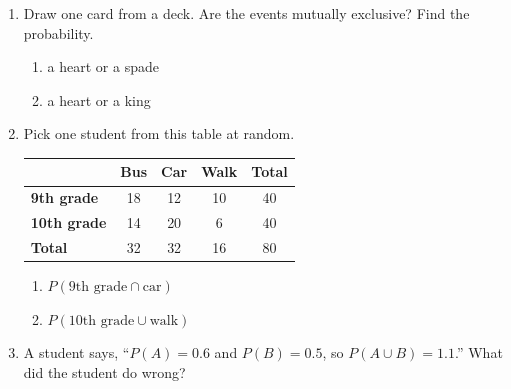 \documentclass[11pt]{article}
\begin{document}
\begin{enumerate}
\work{2.5em}

\newpage
\item Draw one card from a deck. Are the events mutually exclusive? Find the probability.
\begin{enumerate}[itemsep=1em]
  \item a heart or a spade

  \work{2.5em}
  \item a heart or a king

\end{enumerate}
\work{2.5em}

\item Pick one student from this table at random.

\begin{center}
\renewcommand{\arraystretch}{1.4}
\begin{tabular}{|l|c|c|c|c|}\hline
 & \textbf{Bus} & \textbf{Car} & \textbf{Walk} & \textbf{Total} \\ \hline
\textbf{9th grade} & 18 & 12 & 10 & 40 \\ \hline
\textbf{10th grade} & 14 & 20 & 6 & 40 \\ \hline
\textbf{Total} & 32 & 32 & 16 & 80 \\ \hline
\end{tabular}
\end{center}
\begin{enumerate}[itemsep=1em]
  \item $P(\text{9th grade} \cap \text{car})$ 
  \item $P(\text{10th grade} \cup \text{walk})$ 
\end{enumerate}
\work{2em}

\item A student says, ``$P(A) = 0.6$ and $P(B) = 0.5$, so $P(A \cup B) = 1.1$.'' What did the student do wrong?


\end{enumerate}
\end{document}
